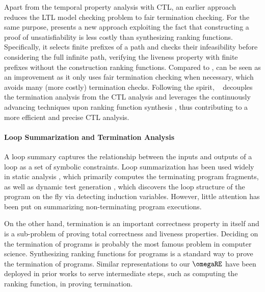 Apart from the temporal property analysis with CTL, an earlier approach  \cite{DBLP:conf/popl/CookGPRV07} reduces the LTL model checking problem to fair termination checking. For the same purpose, \ultimate \cite{DBLP:conf/cav/DietschHLP15} presents a new approach exploiting the fact that constructing a proof of unsatisfiability is less costly than synthesizing ranking functions. 
Specifically, it selects finite prefixes of a path and checks their infeasibility before considering the full infinite path, verifying the liveness property with finite prefixes without the construction ranking functions. 
Compared to \cite{DBLP:conf/popl/CookGPRV07}, \ultimateshort can be seen as an improvement as it only uses fair termination checking when necessary, which avoids many (more costly) termination checks. 
Following the spirit, \toolName~ decouples the termination analysis from the CTL analysis and leverages the continuously advancing techniques upon ranking function synthesis  \cite{DBLP:conf/tacas/ColonS01,DBLP:conf/vmcai/PodelskiR04,bradley2005polyranking,DBLP:conf/concur/NeumannO020}, thus contributing to a more efficient and precise CTL analysis. 


\vspace{-1mm}
\noindent\paragraph{\textbf{Loop Summarization and Termination Analysis}}
A loop summary captures the relationship between the inputs and outputs of a loop as a set of symbolic constraints.
Loop summarization has been used widely in static analysis \cite{DBLP:conf/tacas/TsitovichSWK11,DBLP:journals/tse/XieCZLLL19}, which primarily computes the terminating program fragments, as well as dynamic test generation \cite{DBLP:conf/issta/GodefroidL11}, which discovers the loop structure of the program on the fly via detecting induction variables. However, little attention has been put on summarizing non-terminating program executions. 

On the other hand, termination is an important correctness property in itself and is a sub-problem of proving total correctness and liveness properties. Deciding on the termination of programs is probably the most famous problem in computer science. Synthesizing ranking functions for programs is a standard way to prove the termination of programs. 
Similar representations to our $\omegaRE$ have been deployed in prior works \cite{DBLP:conf/pldi/CookPR06,DBLP:conf/cav/HeizmannHP14,DBLP:conf/pldi/0001K21} to serve intermediate steps, such as computing the ranking function, in proving termination. 



